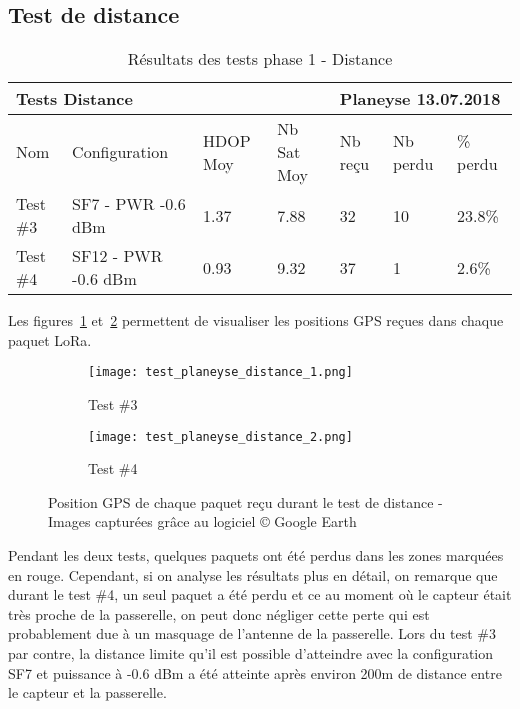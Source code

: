 \subsection{Test de distance}

\begin{table}[htb]
\caption[Résultats des tests phase 1 - Distance]{Résultats des tests phase 1 - Distance}
\label{tab:resultat_test_1_distance}
\centering
\begin{tabular}{lllllll}
\toprule
\multicolumn{4}{l}{ Tests Distance } & \multicolumn{3}{l}{ Planeyse 13.07.2018 } \\
\toprule
Nom & Configuration & HDOP Moy & Nb Sat Moy & Nb reçu & Nb perdu & \% perdu \\
\midrule
Test \#3 & SF7 - PWR -0.6 dBm & 1.37 & 7.88 & 32 & 10 & 23.8\% \\
Test \#4 & SF12 - PWR -0.6 dBm & 0.93 & 9.32 & 37 & 1 & 2.6\%  \\
\bottomrule 
\end{tabular}
\end{table}

Les figures~\ref{fig:test_distance_1} et~\ref{fig:test_distance_2} permettent de visualiser les positions GPS reçues dans chaque paquet LoRa.

\begin{figure}[htb]
\centering
\begin{subfigure}{.5\textwidth}
  \centering
  \texttt{[image: test\_planeyse\_distance\_1.png]}
  \caption{Test \#3}
  \label{fig:test_distance_1}
\end{subfigure}%
\begin{subfigure}{.5\textwidth}
  \centering
  \texttt{[image: test\_planeyse\_distance\_2.png]}
  \caption{Test \#4}
  \label{fig:test_distance_2}
\end{subfigure}
\caption[Positions GPS des tests distance]{Position GPS de chaque paquet reçu durant le test de distance - Images capturées grâce au logiciel © Google Earth}
\label{fig:test_distance}
\end{figure}

Pendant les deux tests, quelques paquets ont été perdus dans les zones marquées en rouge. Cependant, si on analyse les résultats plus en détail, on remarque que durant le test \#4, un seul paquet a été perdu et ce au moment où le capteur était très proche de la passerelle, on peut donc négliger cette perte qui est probablement due à un masquage de l'antenne de la passerelle. 
Lors du test \#3 par contre, la distance limite qu'il est possible d'atteindre avec la configuration SF7 et puissance à -0.6 dBm a été atteinte après environ 200m de distance entre le capteur et la passerelle.

